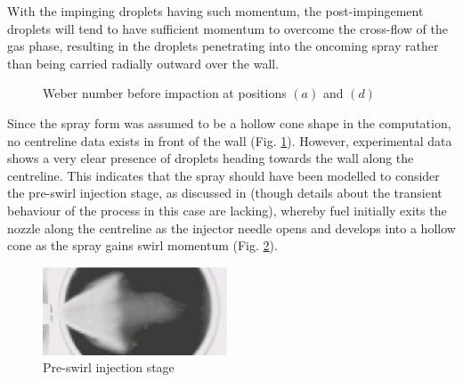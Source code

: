 \documentclass[a4paper,10pt]{article}
\begin{document}
With the impinging droplets having such momentum, the post-impingement droplets will tend to have sufficient momentum to overcome the cross-flow of the gas phase, resulting in the droplets penetrating into the oncoming spray rather than being carried radially outward over the wall.
\begin{figure}[H]
\centering
{}
\caption{Weber number before impaction at positions $(a)$ and $(d)$}
\label{fig:we_pre_ad}
\end{figure}

Since the spray form was assumed to be a hollow cone shape in the computation, no centreline data exists in front of the wall (Fig. \ref{fig:we_pre_ad}). However, experimental data shows a very clear presence of droplets heading towards the wall along the centreline. This indicates that the spray should have been modelled to consider the pre-swirl injection stage, as discussed in \cite{wigley2001} (though details about the transient behaviour of the process in this case are lacking), whereby fuel initially exits the nozzle along the centreline as the injector needle opens and develops into a hollow cone as the spray gains swirl momentum (Fig. \ref{fig:wigley}).
\begin{figure}[H]
\centering
\includegraphics[width=0.49\textwidth]{wigleyc.eps}
\caption{Pre-swirl injection stage \cite{wigley2001}}
\label{fig:wigley}
\end{figure}
\end{document}
